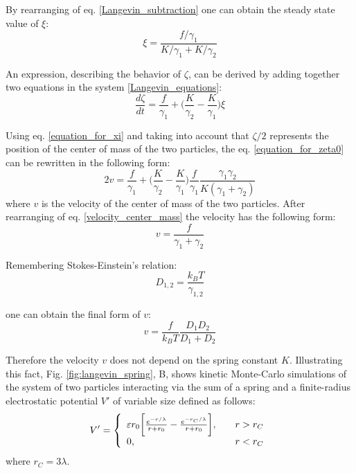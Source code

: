 By rearranging of eq. \eqref{Langevin_subtraction} one can obtain the steady state value of $\xi$:
\begin{equation}
\label{equation_for_xi}
 \xi = \frac{f/\gamma_1}{K/\gamma_1 + K/\gamma_2}
\end{equation}

An expression, describing the behavior of $\zeta$, can be derived by adding together two equations in the system \eqref{Langevin_equations}:
\begin{equation}
\label{equation_for_zeta0}
  \frac{d\zeta}{dt} = \frac{f}{\gamma_1} + \Big(\frac{K}{\gamma_2} - \frac{K}{\gamma_1}\Big)\xi
\end{equation}

Using eq. \eqref{equation_for_xi} and taking into account that $\zeta/2$ represents the position of the center of mass of the two particles, the eq. \eqref{equation_for_zeta0} can be rewritten in the following form:
\begin{equation}
 \label{velocity_center_mass}
  2v = \frac{f}{\gamma_1} + \Big(\frac{K}{\gamma_2} - \frac{K}{\gamma_1}\Big)\frac{f}{\gamma_1}\frac{\gamma_1\gamma_2}{K(\gamma_1 + \gamma_2)}
\end{equation}
where $v$ is the velocity of the center of mass of the two particles. After rearranging of eq. \eqref{velocity_center_mass} the velocity has the following form:
\begin{equation}
 v= \frac{f}{\gamma_1+\gamma_2}
\end{equation}

Remembering Stokes-Einstein's relation:
\begin{equation}
 D_{1,2} = \frac{k_BT}{\gamma_{1,2}}
\end{equation}

one can obtain the final form of $v$:
\begin{equation}
 v=\frac{f}{k_BT}\frac{D_1D_2}{D_1+D_2}
\end{equation}

Therefore the velocity $v$ does not depend on the spring constant $K$. Illustrating this fact, Fig. \ref{fig:langevin_spring}, B, shows kinetic Monte-Carlo simulations of the system of two particles interacting via the sum of a spring and a finite-radius electrostatic potential $V'$ of variable size defined as follows:
\begin{equation}
\label{strange_potential}
 V'= \left\{
  \begin{array}{l l}
    \varepsilon r_0 \bigg[\frac{e^{-r/\lambda}}{r+r_0} - \frac{e^{-r_C/\lambda}}{r+r_0}\bigg], & \quad r>r_C \\
    0, & \quad r<r_C\\
  \end{array} \right.
\end{equation}
where $r_C=3\lambda$.

